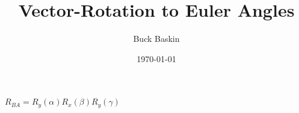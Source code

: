 \documentclass{article}%
\title{Vector{-}Rotation to Euler Angles}%
\author{Buck Baskin}%
\date{\today}%
\begin{document}
%
\normalsize%
\maketitle%
$R_{BA} = R_{y}(\alpha) R_{x}(\beta) R_{y}(\gamma)$
%
\end{document}
